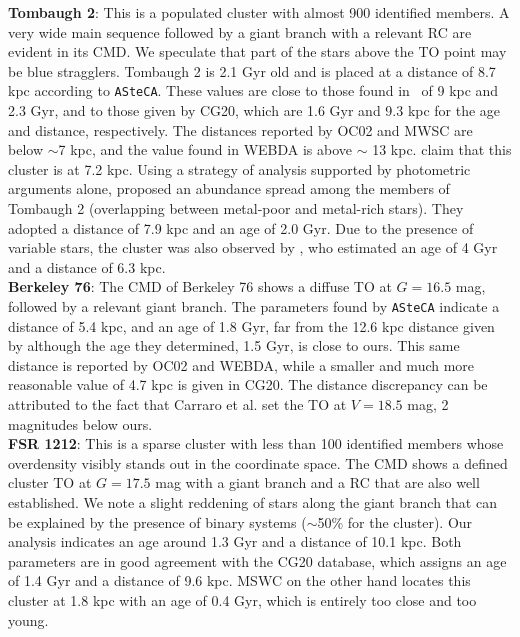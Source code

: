 \documentclass{aa}
\begin{document}
\begin{appendix}
  \noindent \textbf{Tombaugh 2}: This is a populated cluster with almost 900 identified
  members. A very wide main sequence followed by a giant branch with a relevant
  RC are evident in its CMD. We speculate that part of the stars
  above the TO point may be blue stragglers. Tombaugh 2 is 2.1 Gyr old and is
  placed at a distance of 8.7 kpc according to \texttt{ASteCA}. These values are
  close to those found in~\cite{Dias_2021} of 9 kpc and 2.3 Gyr, and
  to those given by CG20, which are 1.6 Gyr and 9.3 kpc for the age
  and distance, respectively. The distances reported by OC02 and MWSC are below
  $\sim$7 kpc, and the value found in WEBDA is above $\sim$ 13 kpc.
  \cite{Villanova_2010} claim that this cluster is at 7.2 kpc.
  Using a strategy of analysis supported by photometric arguments alone, 
  \cite{Frinchaboy_2008} proposed an abundance spread among the members of
  Tombaugh 2 (overlapping between metal-poor and metal-rich stars). They adopted a
  distance of 7.9 kpc and an age of 2.0 Gyr.
  Due to the presence of variable stars, the cluster was also observed by
  \cite{Kubiak_1992}, who estimated an age of 4 Gyr and a distance of 6.3 kpc.\\

  \noindent \textbf{Berkeley 76}: The CMD of Berkeley 76 shows a diffuse TO at $G=16.5$
  mag, followed by a relevant giant branch. The parameters found by
  \texttt{ASteCA} indicate a distance of 5.4 kpc, and an age of 1.8 Gyr, far
  from the 12.6 kpc distance given
  by \cite{Carraro_2013_Five} although the age they determined, 1.5 Gyr, is
  close to ours. This same distance is reported by OC02 and WEBDA, while a
  smaller and much more reasonable value of 4.7 kpc is given in CG20.
  The distance discrepancy can be attributed to the fact that Carraro et al. set
  the TO at $V=18.5$ mag, 2 magnitudes below ours.\\

  \noindent \textbf{FSR 1212}: This is a sparse cluster with less than 100 identified 
  members whose overdensity visibly stands out in the coordinate space. The CMD
  shows a defined cluster TO at $G=17.5$ mag with a giant branch and a RC that
  are also well established. We note a slight reddening of stars along the
  giant branch that can be explained by the presence of binary systems 
  ($\sim$50\% for the cluster).
  Our analysis indicates an age around 1.3 Gyr and a distance of 10.1
  kpc. Both parameters are in good agreement with the CG20 database, which
  assigns an age of 1.4 Gyr and a distance of 9.6 kpc. MSWC on the other hand
  locates this cluster at 1.8 kpc with an age of 0.4 Gyr, which is entirely too
  close and too young.\\


\end{appendix}
\end{document}
